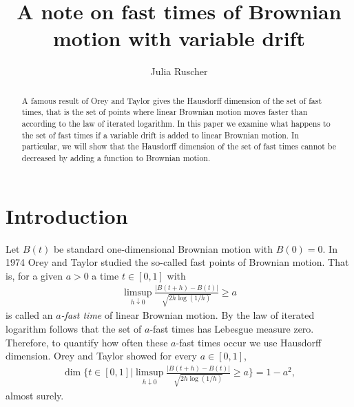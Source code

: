 \documentclass[11pt, reqno]{amsart}
\title{A note on fast times of Brownian motion with variable drift}
\author{}
\theoremstyle{plain}
\theoremstyle{definition}
\theoremstyle{remark}
\begin{document}
\author[J. Ruscher]{Julia Ruscher}

\address{
Fachbereich Mathematik\\
Technische Universit\"{a}t Berlin\\
Strasse des 17. Juni 136\\
D-10623 Berlin\\
and\newline
Institute for Advanced Study\\
Einstein Drive\\
Princeton, NJ 08540
}


\begin{abstract}
A famous result of Orey and Taylor gives the Hausdorff dimension of the set of fast times, that is the set of points where linear Brownian
motion moves faster than according to the law of iterated logarithm.
In this paper we examine what happens to the set of fast times if a variable drift is added to linear Brownian motion.
In particular, we will show that the Hausdorff dimension of the set of fast times cannot be decreased by adding a function to Brownian motion.
\end{abstract}

\maketitle
\section{Introduction}

Let $B(t)$ be standard one-dimensional Brownian motion with $B(0)=0$.
In 1974 Orey and Taylor \cite{OT74} studied the so-called fast points of Brownian motion. That is, for a given $a>0$ a time $t\in[0,1]$ with \begin{align*}
\limsup_{h \downarrow 0} \frac{|B(t+h)-B(t)|}{\sqrt{2h\log{(1/h)}}} \geq a
\end{align*}
is called an \emph{$a$-fast time} of linear Brownian motion. By the law of iterated logarithm follows that the set of $a$-fast times has Lebesgue measure zero. Therefore, to quantify how often these $a$-fast times occur we use Hausdorff dimension. Orey and Taylor \cite{OT74} showed 
for every $a\in[0,1]$,
\begin{align} \label{thm: OT74}
\dim \Big\{ t\in[0,1] \Big| \limsup_{h \downarrow 0} \frac{|B(t+h)-B(t)|}{\sqrt{2h\log{(1/h)}}} \geq a  \Big\} = 1-a^2,
\end{align}
almost surely.
\end{document}
